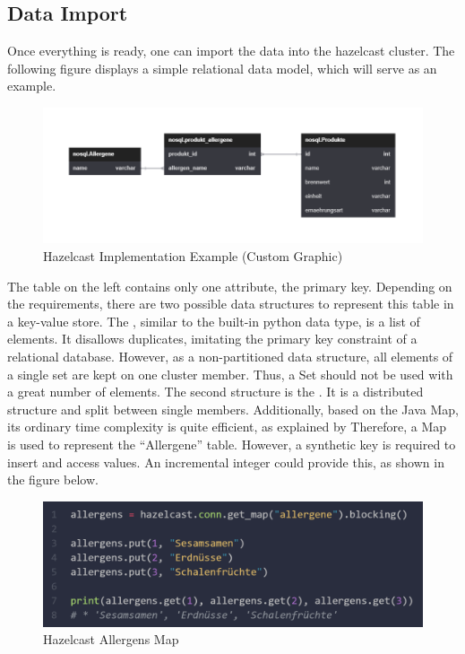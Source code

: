 \subsection{Data Import} \label{subsec:dataImportHazelcast}

Once everything is ready, one can import the data into the hazelcast cluster. The following figure displays
a simple relational data model, which will serve as an example.

\begin{figure}[H]
    \centering
    \caption{Hazelcast Implementation Example (Custom Graphic)} \label{fig:hazelcast.implementation.tables}
    \includegraphics[width=\textwidth]{images/hazelcast.implementation.tables.png}
\end{figure}

The table on the left contains only one attribute, the primary key. Depending on the requirements,
there are two possible data structures to represent this table in a key-value store.
The \textcite{Hazelcast.DataStructure.Set}, similar to
the built-in python data type, is a list of elements. It disallows duplicates, imitating the primary
key constraint of a relational database.
However, as a non-partitioned data structure,
all elements of a single set are kept on one cluster member. Thus, a Set should not be used with a great number of elements.
The second structure is the \textcite{Hazelcast.DataStructure.Map}. It is a distributed structure and split between single members.
Additionally, based on the Java Map, its ordinary time
complexity is quite efficient, as explained by \textcite{Hazelcast.Java.Map}
Therefore, a Map is used to represent the \enquote{Allergene} table.
However, a synthetic key is required to insert and access values.
An incremental integer could provide this, as shown in the figure below.


\begin{figure}[H]
    \centering
    \caption{Hazelcast Allergens Map} \label{fig:hazelcast.allergens.map}
    \includegraphics[width=\textwidth]{images/hazelcast.allergens.map.png}
\end{figure}

